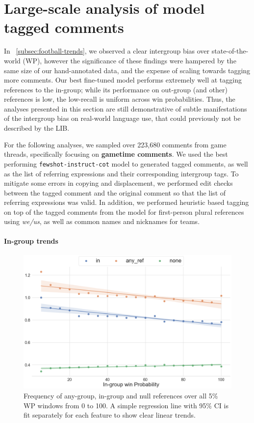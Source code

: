 \section{Large-scale analysis of model tagged comments}
\label{sec:football-analysis}

In \textsection~\ref{subsec:football-trends}, we observed a clear intergroup bias over state-of-the-world (WP), however the significance of these findings were hampered by the same size of our hand-annotated data, and the expense of scaling towards tagging more comments. Our best fine-tuned model performs extremely well at tagging references to the in-group; while its performance on out-group (and other) references is low, the low-recall is uniform across win probabilities. Thus, the analyses presented in this section are still demonstrative of subtle manifestations of the intergroup bias on real-world language use, that could previously not be described by the LIB.

For the following analyses, we sampled over 223,680 comments from game threads, specifically focusing on \textbf{gametime comments}. We used the best performing \texttt{fewshot-instruct-cot} model to generated tagged comments, as well as the list of referring expressions and their corresponding intergroup tags. To mitigate some errors in copying and displacement, we performed edit checks between the tagged comment and the original comment so that the list of referring expressions was valid. In addition, we performed heuristic based tagging on top of the tagged comments from the model for first-person plural references using \emph{we/us}, as well as common names and nicknames for teams.

\paragraph{In-group trends}

\begin{figure}[t]
    \centering
    \includegraphics[width=\linewidth]{figures/trends-1.png}
    \caption{Frequency of any-group, in-group and null references over all 5\% WP windows from 0 to 100. A simple regression line with 95\% CI is fit separately for each feature to show clear linear trends.}
    \label{fig:trends-1}
\end{figure}


